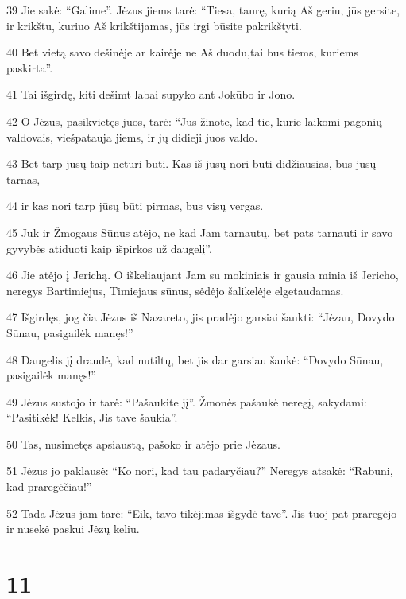 \par 39 Jie sakė: “Galime”. Jėzus jiems tarė: “Tiesa, taurę, kurią Aš geriu, jūs gersite, ir krikštu, kuriuo Aš krikštijamas, jūs irgi būsite pakrikštyti. 
\par 40 Bet vietą savo dešinėje ar kairėje ne Aš duodu,­tai bus tiems, kuriems paskirta”. 
\par 41 Tai išgirdę, kiti dešimt labai supyko ant Jokūbo ir Jono. 
\par 42 O Jėzus, pasikvietęs juos, tarė: “Jūs žinote, kad tie, kurie laikomi pagonių valdovais, viešpatauja jiems, ir jų didieji juos valdo. 
\par 43 Bet tarp jūsų taip neturi būti. Kas iš jūsų nori būti didžiausias, bus jūsų tarnas, 
\par 44 ir kas nori tarp jūsų būti pirmas, bus visų vergas. 
\par 45 Juk ir Žmogaus Sūnus atėjo, ne kad Jam tarnautų, bet pats tarnauti ir savo gyvybės atiduoti kaip išpirkos už daugelį”. 
\par 46 Jie atėjo į Jerichą. O iškeliaujant Jam su mokiniais ir gausia minia iš Jericho, neregys Bartimiejus, Timiejaus sūnus, sėdėjo šalikelėje elgetaudamas. 
\par 47 Išgirdęs, jog čia Jėzus iš Nazareto, jis pradėjo garsiai šaukti: “Jėzau, Dovydo Sūnau, pasigailėk manęs!” 
\par 48 Daugelis jį draudė, kad nutiltų, bet jis dar garsiau šaukė: “Dovydo Sūnau, pasigailėk manęs!” 
\par 49 Jėzus sustojo ir tarė: “Pašaukite jį”. Žmonės pašaukė neregį, sakydami: “Pasitikėk! Kelkis, Jis tave šaukia”. 
\par 50 Tas, nusimetęs apsiaustą, pašoko ir atėjo prie Jėzaus. 
\par 51 Jėzus jo paklausė: “Ko nori, kad tau padaryčiau?” Neregys atsakė: “Rabuni, kad praregėčiau!” 
\par 52 Tada Jėzus jam tarė: “Eik, tavo tikėjimas išgydė tave”. Jis tuoj pat praregėjo ir nusekė paskui Jėzų keliu.



\chapter{11}


